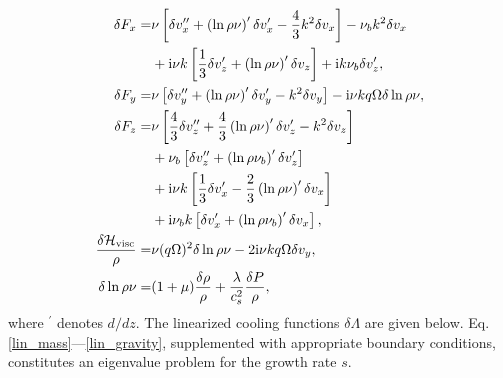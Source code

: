 \begin{align}
  \delta F_x =& \nu \left[\delta v_x^{\prime\prime} + 
    \left(\ln{\rho\nu}\right)^\prime \delta v_x^\prime - 
     \frac{4}{3}k^2\delta v_x \right] - \nu_bk^2\delta v_x \notag\\
   &+ \mathrm{i} \nu k \left[\frac{1}{3}\delta v_z^\prime+ 
    \left(\ln{\rho\nu}\right)^\prime\delta v_z\right] + \mathrm{i} k \nu_b
  \delta v_z^\prime,\\
  \delta F_y = & \nu  \left[\delta v_y^{\prime\prime} + 
    \left(\ln{\rho\nu}\right)^\prime \delta v_y^\prime - 
     k^2\delta v_y \right] - \mathrm{i}\nu kq\Omega\delta\ln{\rho\nu},\\
  \delta F_z =& \nu\left[\frac{4}{3}\delta v_z^{\prime\prime} + 
    \frac{4}{3}\left(\ln{\rho\nu}\right)^\prime \delta v_z^\prime - 
    k^2\delta v_z \right] \notag\\
  & +\nu_b\left[\delta v_z^{\prime\prime} + \left(\ln{\rho\nu_b}\right)^\prime\delta v_z^\prime\right]\notag\\
  & + \mathrm{i} \nu k  \left[\frac{1}{3}\delta v_x^\prime -  
    \frac{2}{3}\left(\ln{\rho\nu}\right)^\prime\delta v_x\right]\notag\\
  &+\mathrm{i} \nu_b k \left[\delta v_x^\prime + \left(\ln{\rho\nu_b}\right)^\prime\delta v_x\right],\\
  \frac{\delta\mathcal{H}_\mathrm{visc}}{\rho}=& \nu (q\Omega)^2
  \delta\ln{\rho\nu} - 2\mathrm{i}\nu k q \Omega \delta v_y,\\
  \delta\ln{\rho\nu} =& (1+\mu)\frac{\delta\rho}{\rho} +
  \frac{\lambda}{c_s^2}\frac{\delta P}{\rho}, 
\end{align}\label{linear_beta_cool}
where $^\prime$ denotes $d/dz$. The linearized cooling functions
$\delta\Lambda$ are given below. 
Eq. \ref{lin_mass}---\ref{lin_gravity}, supplemented with appropriate
boundary conditions, constitutes an eigenvalue problem for the growth
rate $s$. 

